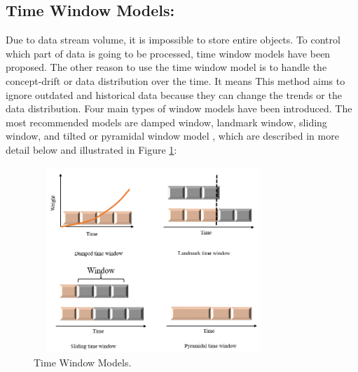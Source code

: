 \documentclass[../UNBThesis2.tex]{subfiles}
\begin{document}
\subsection{Time Window Models:}
Due to data stream volume, it is impossible to store entire objects. To control which part of data is going to be processed, time window models have been proposed. The other reason to use the time window model is to handle the concept-drift or data distribution over the time. It means This method aims to ignore outdated and historical data because they can change the trends or the data distribution.
Four main types of window models have been introduced. The most recommended models are damped window, landmark window, sliding window, and tilted or pyramidal window model \cite{nguyen2015survey, mansalis2018evaluation}, which are described in more detail below and illustrated in Figure \ref{time1}:

\begin{figure}[!h]
\centering
\includegraphics[width = 9cm,height = 7cm]{image/timeW.PNG}
\caption{Time Window Models.}
\label{time1}
\end{figure}
\end{document}
